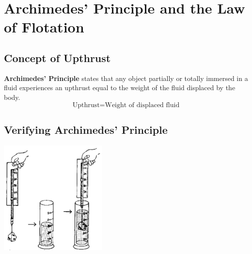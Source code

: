 \section{Archimedes' Principle and the Law of Flotation}  

\begin{multicols}{2}


\section*{Concept of Upthrust}
\textbf{Archimedes' Principle} states that any object partially or totally immersed in a fluid experiences an upthrust equal to the weight of the fluid displaced by the body.
$$ \text{Upthrust} = \text{Weight of displaced fluid}$$

\subsection{Verifying Archimedes' Principle}

\begin{center}
\includegraphics[width=0.4\textwidth]{./img/source/upthrust.png}
\end{center}


\end{multicols}
